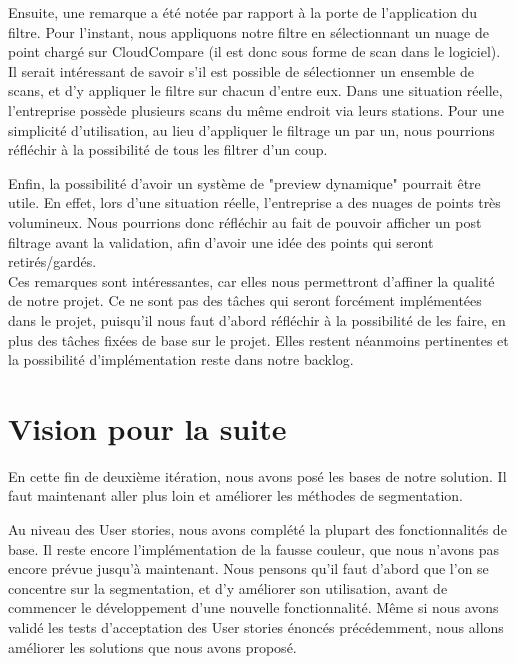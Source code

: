 \documentclass[12pt,titlepage,french]{article}
\begin{document}
Ensuite, une remarque a été notée par rapport à la porte de l'application du filtre. Pour l'instant, nous appliquons notre filtre en sélectionnant un nuage de point chargé sur CloudCompare (il est donc sous forme de scan dans le logiciel). Il serait intéressant de savoir s'il est possible de sélectionner un ensemble de scans, et d'y appliquer le filtre sur chacun d'entre eux. Dans une situation réelle, l'entreprise possède plusieurs scans du même endroit via leurs stations. Pour une simplicité d'utilisation, au lieu d'appliquer le filtrage un par un, nous pourrions réfléchir à la possibilité de tous les filtrer d'un coup.

Enfin, la possibilité d'avoir un système de "preview dynamique" pourrait être utile. En effet, lors d'une situation réelle, l'entreprise a des nuages de points très volumineux. Nous pourrions donc réfléchir au fait de pouvoir afficher un post filtrage avant la validation, afin d'avoir une idée des points qui seront retirés/gardés.\\

Ces remarques sont intéressantes, car elles nous permettront d'affiner la qualité de notre projet. Ce ne sont pas des tâches qui seront forcément implémentées dans le projet, puisqu'il nous faut d'abord réfléchir à la possibilité de les faire, en plus des tâches fixées de base sur le projet. Elles restent néanmoins pertinentes et la possibilité d'implémentation reste dans notre backlog.

\section{Vision pour la suite}


En cette fin de deuxième itération, nous avons posé les bases de notre solution. Il faut maintenant aller plus loin et améliorer les méthodes de segmentation.

Au niveau des User stories, nous avons complété la plupart des fonctionnalités de base. Il reste encore l'implémentation de la fausse couleur, que nous n'avons pas encore prévue jusqu'à maintenant. Nous pensons qu'il faut d'abord que l'on se concentre sur la segmentation, et d'y améliorer son utilisation, avant de commencer le développement d'une nouvelle fonctionnalité. Même si nous avons validé les tests d'acceptation des User stories énoncés précédemment, nous allons améliorer les solutions que nous avons proposé.
\end{document}
